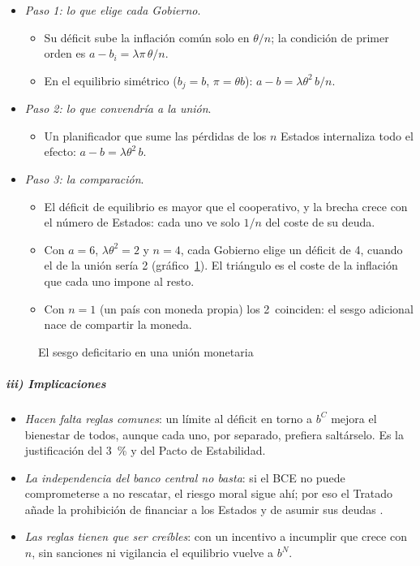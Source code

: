 \documentclass[11pt]{article}
\begin{document}
\begin{itemize}
\item \emph{Paso 1: lo que elige cada Gobierno}.
  \begin{itemize}
  \item Su déficit sube la inflación común solo en $\theta/n$; la condición de primer orden es $a-b_i=\lambda\pi\,\theta/n$.
  \item En el equilibrio simétrico ($b_j=b$, $\pi=\theta b$): $a-b=\lambda\theta^2\,b/n$.
  \end{itemize}
\item \emph{Paso 2: lo que convendría a la unión}.
  \begin{itemize}
  \item Un planificador que sume las pérdidas de los $n$ Estados internaliza todo el efecto: $a-b=\lambda\theta^2\,b$.
  \end{itemize}
\item \emph{Paso 3: la comparación}.
  \begin{itemize}
  \item El déficit de equilibrio es mayor que el cooperativo, y la brecha crece con el número de Estados: cada uno ve solo $1/n$ del coste de su deuda.
  \item Con $a=6$, $\lambda\theta^2=2$ y $n=4$, cada Gobierno elige un déficit de 4, cuando el de la unión sería 2 (gráfico~\ref{fig:sesgo-union}). El triángulo es el coste de la inflación que cada uno impone al resto.
  \item Con $n=1$ (un país con moneda propia) los 2~coinciden: el sesgo adicional nace de compartir la moneda.
  \end{itemize}
\end{itemize}

\begin{figure}[H]
\centering
\caption{El sesgo deficitario en una unión monetaria}\label{fig:sesgo-union}
\end{figure}

\subparagraph{iii) Implicaciones}

\begin{itemize}
\item \emph{Hacen falta reglas comunes}: un límite al déficit en torno a $b^{C}$ mejora el bienestar de todos, aunque cada uno, por separado, prefiera saltárselo. Es la justificación del 3~\% y del Pacto de Estabilidad.
\item \emph{La independencia del banco central no basta}: si el BCE no puede comprometerse a no rescatar, el riesgo moral sigue ahí; por eso el Tratado añade la prohibición de financiar a los Estados y de asumir sus deudas .
\item \emph{Las reglas tienen que ser creíbles}: con un incentivo a incumplir que crece con $n$, sin sanciones ni vigilancia el equilibrio vuelve a $b^{N}$.
\end{itemize}
\end{document}
